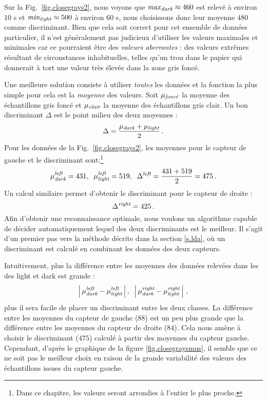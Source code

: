 Sur la Fig.~\ref{fig.closegrays2}, nous voyons que $\mathit{max}_{\textit{\scriptsize dark}}\approx 460$ est relevé  à environ $10$ s et $\mathit{min}_{\textit{\scriptsize light}}\approx 500$ à environ $60$ s, nous choisissons donc leur moyenne $480$ comme discriminant. Bien que cela soit correct pour cet ensemble de données particulier, il n'est généralement pas judicieux d'utiliser les valeurs maximales et minimales car ce pourraient être des \emph{valeurs aberrantes} : des valeurs extrêmes résultant de circonstances inhabituelles, telles qu'un trou dans le papier qui donnerait à tort une valeur très élevée dans la zone gris foncé.

Une meilleure solution consiste à utiliser \emph{toutes} les données et la fonction la plus simple pour cela est la \emph{moyenne} des valeurs. Soit $\mu_{\textit{\scriptsize foncé}}$ la moyenne des échantillons gris foncé et $\mu_{\textit{\scriptsize clair}}$ la moyenne des échantillons gris clair. Un bon discriminant $\Delta$ est le point milieu des deux moyennes :
\begin{displaymath}
\Delta = \frac{\mu_{\textit{\scriptsize dark}} + \mu_{\textit{\scriptsize light}}}{2}\,.
\end{displaymath}
Pour les données de la Fig.~\ref{fig.closegrays2}, les moyennes pour le capteur de gauche et le discriminant sont:\footnote{Dans ce chapitre, les valeurs seront arrondies à l'entier le plus proche.}
\[
\mu_{\textit{\scriptsize dark}}^{\textit{\scriptsize left}} = 431,\;\;
\mu_{\textit{\scriptsize light}}^{\textit{\scriptsize left}} = 519,\;\;
\Delta^{\textit{\scriptsize left}} = \frac{431+519}{2} = 475\,.
\]
Un calcul similaire permet d'obtenir le discriminant pour le capteur de droite :
\[
\Delta^{\textit{\scriptsize right}} = 425\,.
\]
Afin d'obtenir une reconnaissance optimale, nous voulons un algorithme capable de décider automatiquement lequel des deux discriminants est le meilleur. Il s'agit d'un premier pas vers la méthode décrite dans la section \ref{s.lda}, où un discriminant est calculé en combinant les données des deux capteurs.

Intuitivement, plus la différence entre les moyennes des données relevées dans les des light et dark est grande :
\[
\left|\,\mu_{\textit{\scriptsize dark}}^{\textit{\scriptsize left}} - \mu_{\textit{\scriptsize light}}^{\textit{\scriptsize left}}\,\right|,\;\;\left|\,\mu_{\textit{\scriptsize dark}}^{\textit{\scriptsize right}} - \mu_{\textit{\scriptsize light}}^{\textit{\scriptsize right}}\,\right|\,,
\]
plus il sera facile de placer un discriminant entre les deux classes. La différence entre les moyennes du capteur de gauche ($88$) est un peu plus grande que la différence entre les moyennes du capteur de droite ($84$). Cela nous amène à choisir le discriminant ($475$) calculé à partir des moyennes du capteur gauche. Cependant, d'après le graphique de la figure \ref{fig.closegraysmus}, il semble que ce ne soit pas le meilleur choix en raison de la grande variabilité des valeurs des échantillons issues du capteur gauche.

